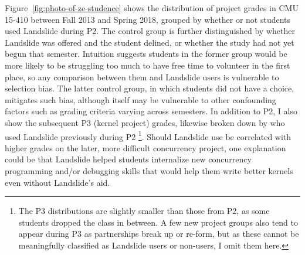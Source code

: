 Figure~\ref{fig:photo-of-ze-studence} shows the distribution of project grades in CMU 15-410
between Fall 2013 and Spring 2018,
grouped by whether or not students used Landslide during P2.
The control group is further distinguished by whether Landslide was offered and the student delined,
or whether the study had not yet begun that semester.
Intuition suggests students in the former group would be more likely
to be struggling too much to have free time to volunteer in the first place,
so any comparison between them and Landslide users is vulnerable to selection bias.
The latter control group, in which students did not have a choice, mitigates such bias,
although itself may be vulnerable to other confounding factors such as grading criteria varying across semesters.
%
In addition to P2, I also show the subsequent P3 (kernel project) grades,
likewise broken down by who used Landslide previously during P2%
\footnote{The P3 distributions are slightly smaller than those from P2,
as some students dropped the class in between.
A few new project groups also tend to appear during P3 as partnerships break up or re-form,
but as these cannot be meaningfully classified as Landslide users or non-users,
I omit them here.
}.
Should Landslide use be correlated with higher grades on the later, more difficult concurrency project,
one explanation could be that Landslide helped students
internalize new concurrency programming and/or debugging skills
that would help them write better kernels even without Landslide's aid.


